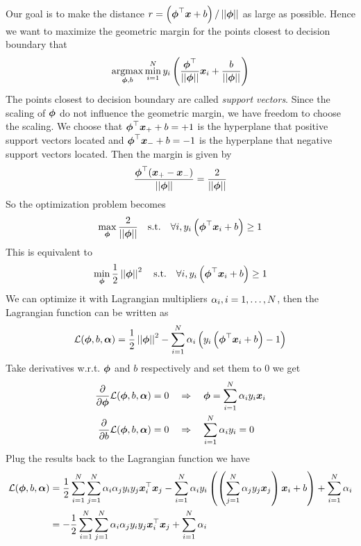 Our goal is to make the distance $r=\left(\boldsymbol{\phi}^\top\boldsymbol{x}+b\right)/\left\vert\left\vert \boldsymbol{\phi} \right\vert\right\vert$ as large as possible. Hence we want to maximize the geometric margin for the points closest to decision boundary that
\begin{align*}
	\argmax_{\vec{\ph},b}\min_{i=1}^Ny_i\left(\frac{\vec{\ph}\TT}{\norm{\vec{\ph}}}\vec{x}_i+\frac{b}{\norm{\vec{\ph}}}\right)
\end{align*}
The points closest to decision boundary are called \emph{support vectors}. Since the scaling of $\boldsymbol{\phi}$ do not influence the geometric margin, we have freedom to choose the scaling. We choose that $\boldsymbol{\phi}^\top\boldsymbol{x}_++b=+1$ is the hyperplane that positive support vectors located and $\boldsymbol{\phi}^\top\boldsymbol{x}_-+b=-1$ is the hyperplane that negative support vectors located. Then the margin is given by
\begin{align*}
	\frac{\boldsymbol{\phi}^\top(\boldsymbol{x}_+-\boldsymbol{x}_-)}{\left\vert\left\vert \boldsymbol{\phi} \right\vert\right\vert}=\frac{2}{\left\vert\left\vert \boldsymbol{\phi} \right\vert\right\vert}
\end{align*}
So the optimization problem becomes
\begin{align*}
	\max_{\boldsymbol{\phi}}\frac{2}{\left\vert\left\vert \boldsymbol{\phi} \right\vert\right\vert}\quad\text{s.t.}\quad\forall i, y_i\left(\boldsymbol{\phi}^\top\boldsymbol{x}_i+b\right)\geq 1
\end{align*}
This is equivalent to
\begin{align*}
	\min_{\boldsymbol{\phi}}\frac{1}{2}\left\vert\left\vert \boldsymbol{\phi} \right\vert\right\vert^2\quad\text{s.t.}\quad\forall i, y_i\left(\boldsymbol{\phi}^\top\boldsymbol{x}_i+b\right)\geq 1
\end{align*}
We can optimize it with Lagrangian multipliers $\alpha_i,i=1,\dotsc,N$, then the Lagrangian function can be written as
\begin{align*}
	\mathcal{L}(\boldsymbol{\phi},b,\boldsymbol{\alpha})=\frac{1}{2}\left\vert\left\vert \boldsymbol{\phi} \right\vert\right\vert^2-\sum_{i=1}^N\alpha_i\left(y_i\left(\boldsymbol{\phi}^\top\boldsymbol{x}_i+b\right)-1\right)
\end{align*}
Take derivatives w.r.t. $\boldsymbol{\phi}$ and $b$ respectively and set them to 0 we get
\begin{align*}
	\frac{\partial}{\partial\boldsymbol{\phi}}\mathcal{L}(\boldsymbol{\phi},b,\boldsymbol{\alpha})=0\quad&\Rightarrow\quad\boldsymbol{\phi}=\sum_{i=1}^N\alpha_iy_i\boldsymbol{x}_i \\
	\frac{\partial}{\partial b}\mathcal{L}(\boldsymbol{\phi},b,\boldsymbol{\alpha})=0\quad&\Rightarrow\quad\sum_{i=1}^N\alpha_iy_i=0
\end{align*}
Plug the results back to the Lagrangian function we have
\begin{align*}
	\mathcal{L}(\boldsymbol{\phi},b,\boldsymbol{\alpha})&=\frac{1}{2}\sum_{i=1}^N\sum_{j=1}^N\alpha_i\alpha_jy_iy_j\boldsymbol{x}_i^\top\boldsymbol{x}_j-\sum_{i=1}^N\alpha_iy_i\left(\left(\sum_{j=1}^N\alpha_jy_j\boldsymbol{x}_j\right)\boldsymbol{x}_i+b\right)+\sum_{i=1}^N\alpha_i \\
	&=-\frac{1}{2}\sum_{i=1}^N\sum_{j=1}^N\alpha_i\alpha_jy_iy_j\boldsymbol{x}_i^\top\boldsymbol{x}_j+\sum_{i=1}^N\alpha_i
\end{align*}
